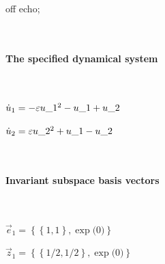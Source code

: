 
off echo;

\(
\)
\paragraph{The specified dynamical system}
\(
\)\par
\(\dot u_{1}=-\varepsilon u\_1^{2}-u\_1+u\_2
\)\par
\(\dot u_{2}=\varepsilon u\_2^{2}+u\_1-u\_2
\)\par
\(\)
\paragraph{Invariant subspace basis vectors}
\(
\)\par
\(\vec e_{1}=\left\{
\left\{
1 , 1
\right\} , \exp \big(0\big)
\right\}
\)\par
\(\vec z_{1}=\left\{
\left\{
1/2 , 1/2
\right\} , \exp \big(0\big)
\right\}
\)\par
